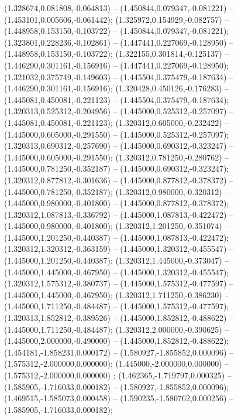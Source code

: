  (1.328674,0.081808,-0.064813) -- (1.450844,0.079347,-0.081221) -- (1.453101,0.005606,-0.061442);
 (1.325972,0.154929,-0.082757) -- (1.448958,0.153150,-0.103722) -- (1.450844,0.079347,-0.081221);
 (1.323801,0.228236,-0.102861) -- (1.447441,0.227069,-0.128950) -- (1.448958,0.153150,-0.103722);
 (1.322155,0.301814,-0.125137) -- (1.446290,0.301161,-0.156916) -- (1.447441,0.227069,-0.128950);
 (1.321032,0.375749,-0.149603) -- (1.445504,0.375479,-0.187634) -- (1.446290,0.301161,-0.156916);
 (1.320428,0.450126,-0.176283) -- (1.445081,0.450081,-0.221123) -- (1.445504,0.375479,-0.187634);
 (1.320313,0.525312,-0.204956) -- (1.445000,0.525312,-0.257097) -- (1.445081,0.450081,-0.221123);
 (1.320312,0.605000,-0.232422) -- (1.445000,0.605000,-0.291550) -- (1.445000,0.525312,-0.257097);
 (1.320313,0.690312,-0.257690) -- (1.445000,0.690312,-0.323247) -- (1.445000,0.605000,-0.291550);
 (1.320312,0.781250,-0.280762) -- (1.445000,0.781250,-0.352187) -- (1.445000,0.690312,-0.323247);
 (1.320312,0.877812,-0.301636) -- (1.445000,0.877812,-0.378372) -- (1.445000,0.781250,-0.352187);
 (1.320312,0.980000,-0.320312) -- (1.445000,0.980000,-0.401800) -- (1.445000,0.877812,-0.378372);
 (1.320312,1.087813,-0.336792) -- (1.445000,1.087813,-0.422472) -- (1.445000,0.980000,-0.401800);
 (1.320312,1.201250,-0.351074) -- (1.445000,1.201250,-0.440387) -- (1.445000,1.087813,-0.422472);
 (1.320312,1.320312,-0.363159) -- (1.445000,1.320312,-0.455547) -- (1.445000,1.201250,-0.440387);
 (1.320312,1.445000,-0.373047) -- (1.445000,1.445000,-0.467950) -- (1.445000,1.320312,-0.455547);
 (1.320312,1.575312,-0.380737) -- (1.445000,1.575312,-0.477597) -- (1.445000,1.445000,-0.467950);
 (1.320312,1.711250,-0.386230) -- (1.445000,1.711250,-0.484487) -- (1.445000,1.575312,-0.477597);
 (1.320313,1.852812,-0.389526) -- (1.445000,1.852812,-0.488622) -- (1.445000,1.711250,-0.484487);
 (1.320312,2.000000,-0.390625) -- (1.445000,2.000000,-0.490000) -- (1.445000,1.852812,-0.488622);
 (1.454181,-1.858231,0.000172) -- (1.580927,-1.855852,0.000096) -- (1.575312,-2.000000,0.000000);
 (1.445000,-2.000000,0.000000) -- (1.575312,-2.000000,0.000000) ;
 (1.462365,-1.719797,0.000325) -- (1.585905,-1.716033,0.000182) -- (1.580927,-1.855852,0.000096);
 (1.469515,-1.585073,0.000458) -- (1.590235,-1.580762,0.000256) -- (1.585905,-1.716033,0.000182);
